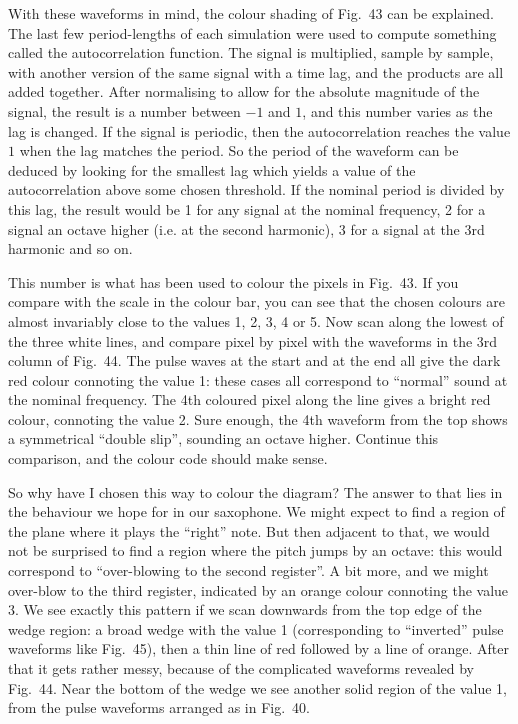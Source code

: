   With these waveforms in mind, the colour shading of Fig.\ 43 can be 
  explained. The last few period-lengths of each simulation were used to 
  compute something called the autocorrelation function. The signal is 
  multiplied, sample by sample, with another version of the same signal with a 
  time lag, and the products are all added together. After normalising to allow 
  for the absolute magnitude of the signal, the result is a number between $-1$ 
  and $1$, and this number varies as the lag is changed. If the signal is 
  periodic, then the autocorrelation reaches the value $1$ when the lag matches 
  the period. So the period of the waveform can be deduced by looking for the 
  smallest lag which yields a value of the autocorrelation above some chosen 
  threshold. If the nominal period is divided by this lag, the result would be 
  1 for any signal at the nominal frequency, 2 for a signal an octave higher 
  (i.e. at the second harmonic), 3 for a signal at the 3rd harmonic and so on. 

  This number is what has been used to colour the pixels in Fig.\ 43. If you 
  compare with the scale in the colour bar, you can see that the chosen colours 
  are almost invariably close to the values 1, 2, 3, 4 or 5. Now scan along the 
  lowest of the three white lines, and compare pixel by pixel with the 
  waveforms in the 3rd column of Fig.\ 44. The pulse waves at the start and at 
  the end all give the dark red colour connoting the value 1: these cases all 
  correspond to ``normal'' sound at the nominal frequency. The 4th coloured 
  pixel along the line gives a bright red colour, connoting the value 2. Sure 
  enough, the 4th waveform from the top shows a symmetrical “double slip”, 
  sounding an octave higher. Continue this comparison, and the colour code 
  should make sense. 

  So why have I chosen this way to colour the diagram? The answer to that lies 
  in the behaviour we hope for in our saxophone. We might expect to find a 
  region of the plane where it plays the “right” note. But then adjacent to 
  that, we would not be surprised to find a region where the pitch jumps by an 
  octave: this would correspond to “over-blowing to the second register”. A bit 
  more, and we might over-blow to the third register, indicated by an orange 
  colour connoting the value 3. We see exactly this pattern if we scan 
  downwards from the top edge of the wedge region: a broad wedge with the value 
  1 (corresponding to “inverted” pulse waveforms like Fig.\ 45), then a thin 
  line of red followed by a line of orange. After that it gets rather messy, 
  because of the complicated waveforms revealed by Fig.\ 44. Near the bottom of 
  the wedge we see another solid region of the value 1, from the pulse 
  waveforms arranged as in Fig.\ 40. 

